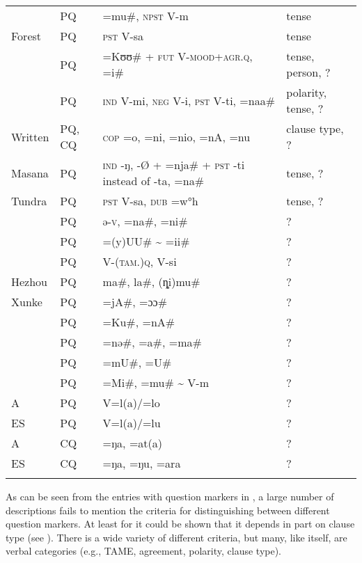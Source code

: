 \begin{table}
\begin{tabularx}{\textwidth}{llQQ}
 & PQ & =mu\#, \textsc{npst} V-m & tense\\
Forest  & PQ & \textsc{pst} V-sa & tense\\
 & PQ & =Kʊʊ\# + \textsc{fut} \textsc{V-mood+agr.q}, =i\# & tense, person, ?\\
 & PQ & \textsc{ind} V-mi, \textsc{neg} V-i, \textsc{pst} V-ti, =naa\# & polarity, tense, ?\\
Written  & PQ, CQ & \textsc{cop} =o, =ni, =nio, =nA, =nu & clause type, ?\\
Masana  & PQ & \textsc{ind} -ŋ, -Ø + =nja\# \textsc{+ pst} -ti instead of -ta, =na\# & tense, ?\\
Tundra  & PQ & \textsc{pst} V-sa, \textsc{dub} =w°h & tense, ?\\
 & PQ & ə{}-\textsc{v}, =na\#, =ni\# & ?\\
 & PQ & =(y)UU\# {\textasciitilde} =ii\# & ?\\
 & PQ & V-(\textsc{tam}.)\textsc{q}, V-si & ?\\
Hezhou & PQ & ma\#, la\#, (ȵi)mu\# & ?\\
Xunke  & PQ & =jA\#, =ɔɔ\# & ?\\
 & PQ & =Ku\#, =nA\# & ?\\
 & PQ & =nə\#, =a\#, =ma\# & ?\\
 & PQ & =mU\#, =U\# & ?\\
 & PQ & =Mi\#, =mu\# {\textasciitilde} V-m & ?\\
A  & PQ & V=l(a)/=lo & ?\\
ES  & PQ & V=l(a)/=lu & ?\\
A  & CQ & =ŋa, =at(a) & ?\\
ES  & CQ & =ŋa, =ŋu, =ara & ?\\
\lspbottomrule
\end{tabularx}
\end{table}

\newpage 
As can be seen from the entries with question markers in , a large number of descriptions fails to mention the criteria for distinguishing between different question markers. At least for  it could be shown that it depends in part on clause type (see ). There is a wide variety of different criteria, but many, like  itself, are verbal categories (e.g., TAME, agreement, polarity, clause type).

